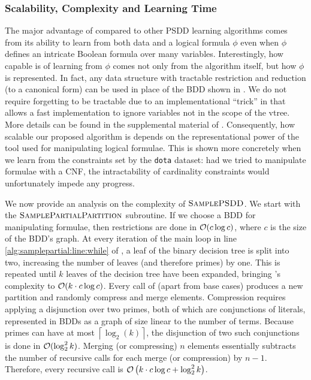 \subsubsection{Scalability, Complexity and Learning Time}

The major advantage of  compared to other PSDD learning algorithms comes from
its ability to learn from both data and a logical formula $\phi$ even when $\phi$ defines an
intricate Boolean formula over many variables. Interestingly, how capable  is
of learning from $\phi$ comes not only from the algorithm itself, but how $\phi$ is represented. In
fact, any data structure with tractable restriction and reduction (to a canonical form) can be used
in place of the BDD shown in . We do not require forgetting to be tractable
due to an implementational ``trick'' in  that allows a fast implementation to
ignore variables not in the scope of the vtree. More details can be found in the supplemental
material of . Consequently, how scalable our proposed algorithm is
depends on the representational power of the tool used for manipulating logical formulae. This is
shown more concretely when we learn from the constraints set by the \texttt{dota} dataset: had we
tried to manipulate formulae with a CNF, the intractability of cardinality constraints would
unfortunately impede any progress.

We now provide an analysis on the complexity of $\textproc{SamplePSDD}$. We start with the
$\textproc{SamplePartialPartition}$ subroutine. If we choose a BDD for manipulating formulae, then
restrictions are done in $\mathcal{O}(c\log c)$, where $c$ is the size of the BDD's graph. At every
iteration of the main loop in line \ref{alg:samplepartial:line:while} of ,
a leaf of the binary decision tree is split into two, increasing the number of leaves (and
therefore primes) by one. This is repeated until $k$ leaves of the decision tree have been
expanded, bringing 's complexity to $\mathcal{O}(k\cdot c\log c)$. Every
call of  (apart from base cases) produces a new partition and randomly
compress and merge elements. Compression requires applying a disjunction over two primes, both of
which are conjunctions of literals, represented in BDDs as a graph of size linear to the number of
terms. Because primes can have at most $\left\lceil\log_2(k)\right\rceil$, the disjunction of two
such conjunctions is done in $\mathcal{O}(\log_2^2 k)$. Merging (or compressing) $n$ elements
essentially subtracts the number of recursive calls for each merge (or compression) by $n-1$.
Therefore, every  recursive call is $\mathcal{O}\left(k\cdot c\log c+\log_2^2 k
\right)$.


